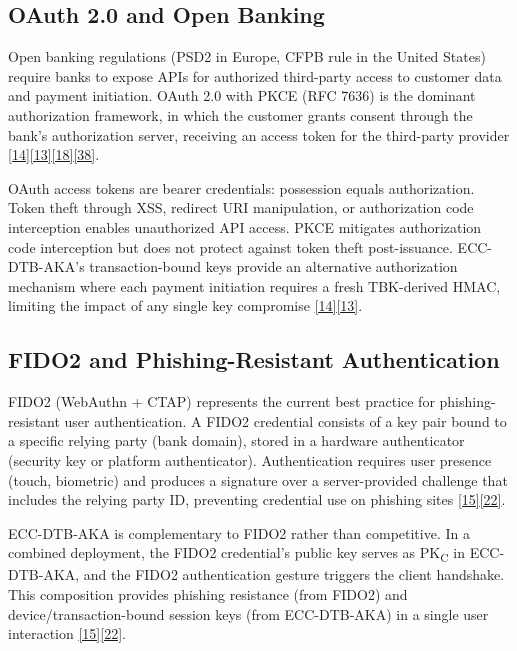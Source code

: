\subsection{OAuth 2.0 and Open Banking}

\indent Open banking regulations (PSD2 in Europe, CFPB rule in the United States) require banks to expose APIs for authorized third-party access to customer data and payment initiation. OAuth 2.0 with PKCE (RFC 7636) is the dominant authorization framework, in which the customer grants consent through the bank's authorization server, receiving an access token for the third-party provider \hyperref[ref:14]{[14]}\hyperref[ref:13]{[13]}\hyperref[ref:18]{[18]}\hyperref[ref:38]{[38]}.

\indent OAuth access tokens are bearer credentials: possession equals authorization. Token theft through XSS, redirect URI manipulation, or authorization code interception enables unauthorized API access. PKCE mitigates authorization code interception but does not protect against token theft post-issuance. ECC-DTB-AKA's transaction-bound keys provide an alternative authorization mechanism where each payment initiation requires a fresh TBK-derived HMAC, limiting the impact of any single key compromise \hyperref[ref:14]{[14]}\hyperref[ref:13]{[13]}.

\subsection{FIDO2 and Phishing-Resistant Authentication}

\indent FIDO2 (WebAuthn + CTAP) represents the current best practice for phishing-resistant user authentication. A FIDO2 credential consists of a key pair bound to a specific relying party (bank domain), stored in a hardware authenticator (security key or platform authenticator). Authentication requires user presence (touch, biometric) and produces a signature over a server-provided challenge that includes the relying party ID, preventing credential use on phishing sites \hyperref[ref:15]{[15]}\hyperref[ref:22]{[22]}.

\indent ECC-DTB-AKA is complementary to FIDO2 rather than competitive. In a combined deployment, the FIDO2 credential's public key serves as PK\textsubscript{C} in ECC-DTB-AKA, and the FIDO2 authentication gesture triggers the client handshake. This composition provides phishing resistance (from FIDO2) and device/transaction-bound session keys (from ECC-DTB-AKA) in a single user interaction \hyperref[ref:15]{[15]}\hyperref[ref:22]{[22]}.

